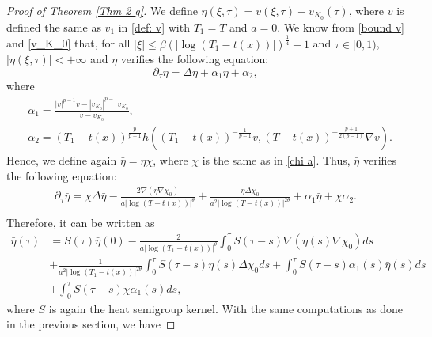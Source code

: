 \documentclass[11pt,a4paper]{article}
\newcommand{\1}{\mathbbm{1}}
\numberwithin{equation}{section}
\theoremstyle{remark}
\begin{document}
\begin{proof}[Proof of Theorem \ref{Thm 2 g}]
We define $\eta(\xi,\tau)=v(\xi,\tau)-v_{K_0}(\tau)$, where $v$ is defined the same as $v_1$ in \eqref{def: v} with $T_1=T$ and $a=0$. We know from \eqref{bound v} and \eqref{v_K_0} that, for all $|\xi|\leq\beta (|\log(T_1-t(x))|)^{\frac{1}{4}}-1$ and $\tau \in [0,1)$, $|\eta(\xi,\tau)|<+\infty$ and $\eta$ verifies the following equation:
$$\partial_\tau \eta=\Delta \eta+\alpha_1 \eta+\alpha_2,$$
where 
\begin{equation*}
\begin{split}
&\alpha_1=\frac{|v|^{p-1}v-|v_{K_0}|^{p-1}v_{K_0}}{v-v_{K_0}},\\
&\alpha_2=(T_1-t(x))^{\frac{p}{p-1}}h\left((T_1-t(x))^{-\frac{1}{p-1}}v,(T-t(x))^{-\frac{p+1}{2(p-1)}}\nabla v\right).
\end{split}
\end{equation*}
Hence, we define again $\bar{\eta}=\eta \chi$, where $\chi$ is the same as in \eqref{chi a}. Thus, $\bar\eta$ verifies the following equation:
\begin{equation*}
\begin{split}
\partial_\tau \bar{\eta}=\chi \Delta \bar{\eta}-\frac{2\nabla(\eta\nabla \chi_0)}{a|\log (T-t(x))|^{\theta}}+\frac{\eta \Delta \chi_0}{a^2|\log (T-t(x))|^{2\theta}}+\alpha_1\bar{\eta}+\chi \alpha_2.\\
\end{split}
\end{equation*}
Therefore, it can be written as
\begin{equation*}
\begin{split}
\bar{\eta}(\tau)&=S(\tau) \bar{\eta}(0)-\frac{2}{a|\log (T_1-t(x))|^{\theta}}\int^\tau_0S(\tau-s)\nabla(\eta(s)\nabla \chi_0)ds\\
&+\frac{1}{a^2|\log (T_1-t(x))|^{2\theta}}\int^\tau_0S(\tau-s)\eta(s) \Delta \chi_0ds+\int^\tau_0 S(\tau-s)\alpha_1(s)\bar{\eta}(s)ds\\
&+\int^\tau_0 S(\tau-s)\chi\alpha_1(s)ds,
\end{split}
\end{equation*}
where $S$ is again the heat semigroup kernel. With the same computations as done in the previous section, we have



\end{proof}
\end{document}

